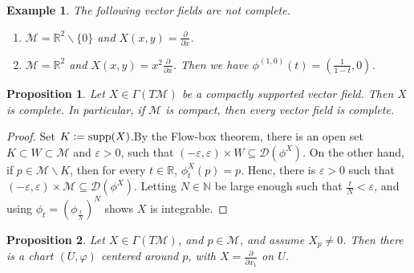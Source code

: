 \documentclass[8pt]{article}
\newtheorem{proposition}{Proposition}[section]
\newtheorem{example}{Example}[section]
\DeclareMathOperator{\supp}{supp}
\newcommand{\defeq}{\vcentcolon=}
\newcommand{\N}[0]{\mathbb{N}}
\newcommand{\R}[0]{\mathbb{R}}
\newcommand{\M}[0]{\mathcal{M}}
\newcommand{\pd}[2]{{\frac {\partial #1} {\partial #2}}}
\begin{document}
\begin{example}
  The following vector fields are not complete.
  \begin{enumerate}[1).]
    \item $\M = \R^2\backslash\{0\}$ and $X(x,y) = \pd{}{x}$. 
    \item $\M = \R^2$ and $X(x,y) = x^2\pd{}{x}$. Then we have $\phi^{(1,0)}(t)=\left({\frac 1 {1-t}},0\right)$. 
  \end{enumerate}
\end{example}

\begin{proposition}
  Let $X\in\Gamma(T\M)$ be a compactly supported vector field. Then $X$ is complete. In particular, if $\M$ is compact, then every vector field is complete.
\end{proposition}

\begin{proof}
Set $K \defeq \supp(X)$.By the Flow-box theorem, there is an open set $K\subset W\subset \M$ and $\varepsilon>0$, such that 
$(-\varepsilon,\varepsilon) \times W\subseteq\mathcal{D}(\phi^X)$. On the other hand, if $p\in\M\backslash K$, then for every $t\in\R$, $\phi_t^X(p) = p$. Henc, there is $\varepsilon>0$ such that 
$(-\varepsilon,\varepsilon)\times \M\subseteq\mathcal{D}(\phi^X)$. Letting $N\in\N$ be large enough such that ${\frac t N}<\varepsilon$, and using $\phi_t = (\phi_{{\frac t N}})^N$ shows $X$ is integrable.
\end{proof}

\begin{proposition}
  Let $X\in\Gamma(T\M)$, and $p\in\M$, and assume $X_p\not =0$. Then there is a chart $(U,\varphi)$ centered around $p$, with $X = \pd{}{x_1}$ on $U$.
\end{proposition}
\end{document}

